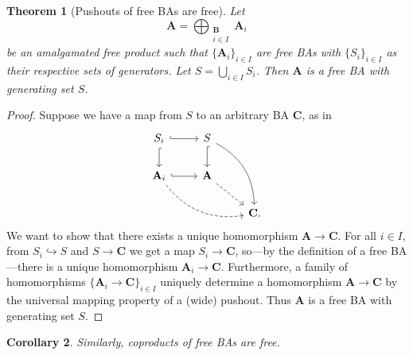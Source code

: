 \documentclass{article}
\newtheorem{theorem}{Theorem}
\newtheorem{corollary}[theorem]{Corollary}
\theoremstyle{definition}
\theoremstyle{remark}
\begin{document}
\begin{theorem}[Pushouts of free BAs are free]
  Let
  \[
    \mathbf{A} = \bigoplus_{\substack{\mathbf{B}\\ i \in I}} \mathbf{A}_i
  \]
  be an amalgamated free product such that $\{ \mathbf{A}_{i} \}_{i \in I}$ are
  free BAs with $\{ S_i \}_{i \in I}$ as their respective sets of generators.
  Let $S = \bigcup_{i \in I} S_i$. Then $\mathbf{A}$ is a free BA with
  generating set $S$.
\end{theorem}
\begin{proof}
  Suppose we have a map from $S$ to an arbitrary BA $\mathbf{C}$, as in
  \[
    \begin{tikzcd}
      S_i \ar[r,hookrightarrow] \ar[d,hookrightarrow] & S \ar[d,hookrightarrow]
      \ar[ddr,bend left] & \\
      \mathbf{A}_i \ar[r,hookrightarrow] \ar[rrd,dashed,bend right] & \mathbf{A}
      \ar[rd,dashed]& \\
      & & \mathbf{C}.
    \end{tikzcd}
  \]
  We want to show that there exists a unique homomorphism $\mathbf{A} \to
  \mathbf{C}$. For all $i \in I$, from $S_i \hookrightarrow S$ and $S \to
  \mathbf{C}$ we get a map $S_i \to \mathbf{C}$, so---by the definition of a
  free BA---there is a unique homomorphism $\mathbf{A}_i \to \mathbf{C}$.
  Furthermore, a family of homomorphisms $\{ \mathbf{A}_i \to \mathbf{C} \}_{i
    \in I}$ uniquely determine a homomorphism $\mathbf{A} \to \mathbf{C}$ by the
  universal mapping property of a (wide) pushout. Thus $\mathbf{A}$ is a free BA
  with generating set $S$.
\end{proof}

\begin{corollary}
  Similarly, coproducts of free BAs are free.
\end{corollary}



\end{document}
